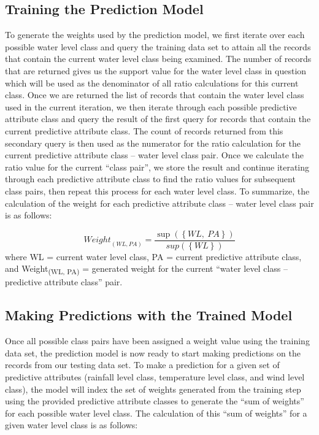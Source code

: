 \documentclass[10pt, conference, compsocconf]{IEEEtran}
\begin{document}
\subsection{Training the Prediction Model}

To generate the weights used by the prediction model, we first iterate over each possible water level class and query the training data set to attain all the records that contain the current water level class being examined. The number of records that are returned gives us the support value for the water level class in question which will be used as the denominator of all ratio calculations for this current class. Once we are returned the list of records that contain the water level class used in the current iteration, we then iterate through each possible predictive attribute class and query the result of the first query for records that contain the current predictive attribute class. The count of records returned from this secondary query is then used as the numerator for the ratio calculation for the current predictive attribute class – water level class pair. Once we calculate the ratio value for the current “class pair”, we store the result and continue iterating through each predictive attribute class to find the ratio values for subsequent class pairs, then repeat this process for each water level class. To summarize, the calculation of the weight for each predictive attribute class – water level class pair is as follows:

\begin{equation*}
{Weight}_{(WL, PA)}=\frac{\sup{\left(\left\{WL,\ PA\right\}\right)}}{sup(\left\{WL\right\})}
\end{equation*}
\noindent
where WL = current water level class, PA = current predictive attribute class, and Weight\textsubscript{(WL, PA)} = generated weight for the current “water level class – predictive attribute class” pair.

\subsection{Making Predictions with the Trained Model}

Once all possible class pairs have been assigned a weight value using the training data set, the prediction model is now ready to start making predictions on the records from our testing data set. To make a prediction for a given set of predictive attributes (rainfall level class, temperature level class, and wind level class), the model will index the set of weights generated from the training step using the provided predictive attribute classes to generate the “sum of weights” for each possible water level class. The calculation of this “sum of weights” for a given water level class is as follows:
\end{document}
